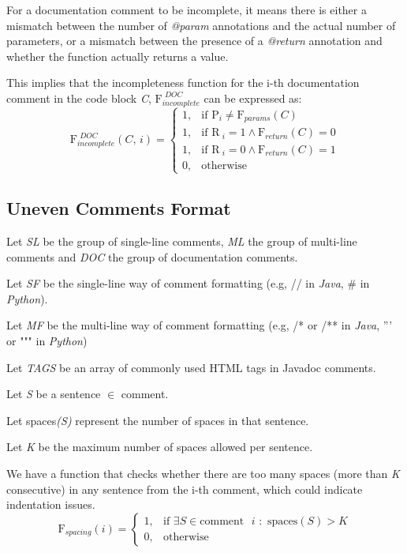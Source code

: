 \noindent For a documentation comment to be incomplete, it means there is either a mismatch between the number of \textit{@param} annotations and the actual number of parameters, or a mismatch between the presence of a \textit{@return} annotation and whether the function actually returns a value.

\noindent This implies that the incompleteness function for the i-th documentation comment in the code block \textit{C}, \text{ } $\mathrm{F}_{incomplete}^{\textit{ DOC}}$ \text{} can be expressed as:
\begin{equation*}
	\mathrm{F}_{incomplete}^{\textit{ DOC}}(\textit{C, i}) = \begin{cases}
		1, & \text{if } \mathrm{P}_{i} \ne \mathrm{F}_{params}(C) \\
		1, & \text{if } \mathrm{R}_{\textit{ i}} = 1 \wedge \mathrm{F}_{return}(C) = 0 \\
		1, & \text{if } \mathrm{R}_{\textit{ i}} = 0 \wedge \mathrm{F}_{return}(C) = 1 \\
		0, & \text{otherwise}
	\end{cases}
\end{equation*}

\subsection{Uneven Comments Format}
Let \textit{SL} be the group of single-line comments, \textit{ML} the group of multi-line comments and \textit{DOC} the group of documentation comments.

\noindent Let \textit{SF} be the single-line way of comment formatting (e.g, // in \textit{Java}, # in \textit{Python}).

\noindent Let \textit{MF} be the multi-line way of comment formatting (e.g, /* or /** in \textit{Java}, ''' or """ in \textit{Python})

\noindent Let \textit{TAGS} be an array of commonly used HTML tags in Javadoc comments.

\noindent Let \textit{S} be a sentence $\in$ comment.

\noindent Let spaces\textit{(S)} represent the number of spaces in that sentence.

\noindent Let \textit{K} be the maximum number of spaces allowed per sentence.

\noindent We have a function that checks whether there are too many spaces (more than \textit{K} consecutive) in any sentence from the i-th comment, which could indicate indentation issues.
\begin{equation*}
	\mathrm{F}_{spacing}(i) = \begin{cases}
		1, & \text{if } \exists S \in \text{comment } \textit{ i } : \text{ spaces}(S) > K \\
		0, & \text{otherwise}
	\end{cases}
\end{equation*}

